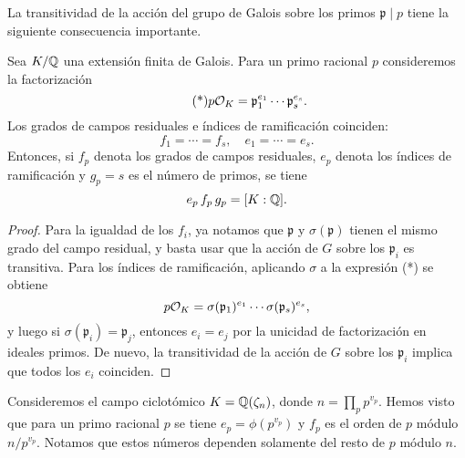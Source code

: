 La transitividad de la acción del grupo de Galois sobre los primos
$\mathfrak{p} \mid p$ tiene la siguiente consecuencia importante.

\begin{proposicion}
  Sea $K/\mathbb{Q}$ una extensión finita de Galois. Para un primo racional $p$
  consideremos la factorización
  \[ \tag{*} p \mathcal{O}_K = \mathfrak{p}_1^{e_1} \cdots \mathfrak{p}_s^{e_s}. \]
  Los grados de campos residuales e índices de ramificación coinciden:
  $$f_1 = \cdots = f_s, \quad e_1 = \cdots = e_s.$$
  Entonces, si $f_p$ denota los grados de campos residuales,
  $e_p$ denota los índices de ramificación y $g_p = s$ es el número de primos,
  se tiene
  $$e_p\,f_p\,g_p = [K : \mathbb{Q}].$$

  \begin{proof}
    Para la igualdad de los $f_i$, ya notamos que $\mathfrak{p}$ y
    $\sigma (\mathfrak{p})$ tienen el mismo grado del campo residual,
    y basta usar que la acción de $G$ sobre los $\mathfrak{p}_i$ es transitiva.
    Para los índices de ramificación, aplicando $\sigma$ a la expresión (*)
    se obtiene
    $$p\mathcal{O}_K = \sigma (\mathfrak{p}_1)^{e_1} \cdots \sigma (\mathfrak{p}_s)^{e_s},$$
    y luego si $\sigma (\mathfrak{p}_i) = \mathfrak{p}_j$, entonces
    $e_i = e_j$ por la unicidad de factorización en ideales primos. De nuevo,
    la transitividad de la acción de $G$ sobre los $\mathfrak{p}_i$ implica que
    todos los $e_i$ coinciden.
  \end{proof}
\end{proposicion}

\begin{ejemplo}
  Consideremos el campo ciclotómico $K = \mathbb{Q} (\zeta_n)$, donde
  $n = \prod_p p^{v_p}$. Hemos visto que para un primo racional $p$
  se tiene $e_p = \phi (p^{v_p})$ y $f_p$ es el orden de $p$ módulo
  $n/p^{v_p}$. Notamos que estos números dependen solamente del resto de $p$
  módulo $n$.
\end{ejemplo}


